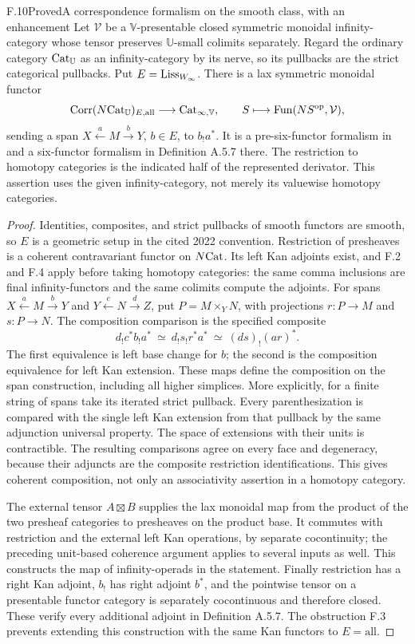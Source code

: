 \begin{claim}{F.10}{Proved}{A correspondence formalism on the smooth class, with an enhancement}
Let $\mathcal V$ be a $\mathbb V$-presentable closed symmetric monoidal infinity-category whose tensor preserves $\mathbb U$-small colimits separately. Regard the ordinary category $\mathrm{Cat}_{\mathbb U}$ as an infinity-category by its nerve, so its pullbacks are the strict categorical pullbacks. Put $E=\mathrm{Liss}_{W_\infty}$. There is a lax symmetric monoidal functor
\[
 \mathrm{Corr}(N\mathrm{Cat}_{\mathbb U})_{E,\mathrm{all}}
 \longrightarrow\mathrm{Cat}_{\infty,\mathbb V},\qquad
 S\longmapsto\mathrm{Fun}(NS^{\mathrm{op}},\mathcal V),
\]
sending a span $X\xleftarrow{a}M\xrightarrow{b}Y$, $b\in E$, to $b_!a^*$. It is a pre-six-functor formalism in \citet[Definitions A.5.1 and A.5.6]{EFMann2022} and a six-functor formalism in Definition A.5.7 there. The restriction to homotopy categories is the indicated half of the represented derivator. This assertion uses the given infinity-category, not merely its valuewise homotopy categories.
\end{claim}
\begin{proof}
Identities, composites, and strict pullbacks of smooth functors are smooth, so $E$ is a geometric setup in the cited 2022 convention. Restriction of presheaves is a coherent contravariant functor on $N\mathrm{Cat}$. Its left Kan adjoints exist, and F.2 and F.4 apply before taking homotopy categories: the same comma inclusions are final infinity-functors and the same colimits compute the adjoints. For spans $X\xleftarrow{a}M\xrightarrow{b}Y$ and $Y\xleftarrow{c}N\xrightarrow{d}Z$, put $P=M\times_YN$, with projections $r:P\to M$ and $s:P\to N$. The composition comparison is the specified composite
\[
 d_!c^*b_!a^*\ \simeq\ d_!s_!r^*a^*
 \ \simeq\ (ds)_!(ar)^*.
\]
The first equivalence is left base change for $b$; the second is the composition equivalence for left Kan extension. These maps define the composition on the span construction, including all higher simplices. More explicitly, for a finite string of spans take its iterated strict pullback. Every parenthesization is compared with the single left Kan extension from that pullback by the same adjunction universal property. The space of extensions with their units is contractible. The resulting comparisons agree on every face and degeneracy, because their adjuncts are the composite restriction identifications. This gives coherent composition, not only an associativity assertion in a homotopy category.

The external tensor $A\boxtimes B$ supplies the lax monoidal map from the product of the two presheaf categories to presheaves on the product base. It commutes with restriction and the external left Kan operations, by separate cocontinuity; the preceding unit-based coherence argument applies to several inputs as well. This constructs the map of infinity-operads in the statement. Finally restriction has a right Kan adjoint, $b_!$ has right adjoint $b^*$, and the pointwise tensor on a presentable functor category is separately cocontinuous and therefore closed. These verify every additional adjoint in Definition A.5.7. The obstruction F.3 prevents extending this construction with the same Kan functors to $E=\mathrm{all}$.
\end{proof}

